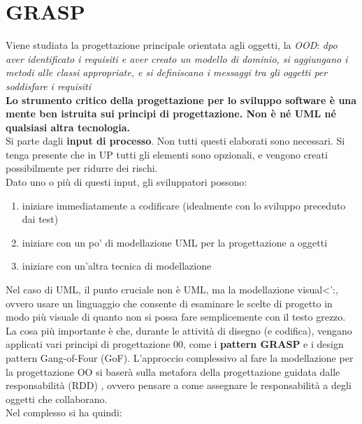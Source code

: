 \documentclass[a4paper,12pt, oneside]{book}
\begin{document}
\chapter{GRASP}
Viene studiata la progettazione principale orientata agli oggetti, la \textit{OOD}: \textit{dpo aver identificato i requisiti e aver creato un modello di dominio, si
aggiungano i metodi alle classi appropriate, e si definiscano i messaggi tra
gli oggetti per soddisfare i requisiti}\\
\textbf{Lo strumento critico della progettazione per lo sviluppo software è una mente ben
  istruita sui principi di progettazione. Non è né UML né qualsiasi altra tecnologia.}\\
Si parte dagli \textbf{input di processo}. Non tutti questi elaborati sono necessari. Si tenga presente che in UP tutti gli elementi
sono opzionali, e vengono creati possibilmente per ridurre dei rischi.\\
Dato uno o più di questi input, gli sviluppatori possono:
\begin{enumerate}
\item iniziare immediatamente a
  codificare (idealmente con lo sviluppo preceduto dai test)
\item iniziare con un po' di
  modellazione UML per la progettazione a oggetti
\item iniziare con un'altra tecnica di
modellazione
\end{enumerate}
Nel caso di UML, il punto cruciale non è UML, ma la modellazione visual<':, ovvero usare un linguaggio che consente di esaminare le scelte di progetto in modo più visuale di
quanto non si possa fare semplicemente con il testo grezzo.\\
La
cosa più importante è che, durante le attività di disegno (e codifica), vengano applicati
vari principi di progettazione 00, come i \textbf{pattern GRASP} e i design pattern Gang-of-Four (GoF). L'approccio complessivo al fare la modellazione per la progettazione OO si
baserà sulla metafora della progettazione guidata dalle responsabilità (RDD) , ovvero
pensare a come assegnare le responsabilità a degli oggetti che collaborano.
\\Nel complesso si ha quindi:
\end{document}
